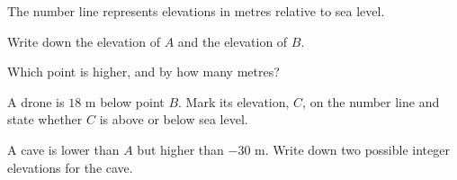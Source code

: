  The number line represents elevations in metres relative to sea level.
\begin{center}
\end{center}
\begin{subparts}
  \item Write down the elevation of $A$ and the elevation of $B$.
  \item Which point is higher, and by how many metres?
  \item A drone is $18$ m below point $B$. Mark its elevation, $C$, on the number line and state whether $C$ is above or below sea level.
  \item A cave is lower than $A$ but higher than $-30$ m. Write down two possible integer elevations for the cave.
\end{subparts}
